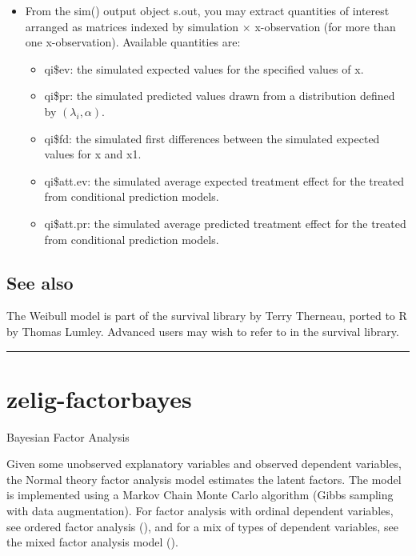 \documentclass[letterpaper,10pt,english]{sphinxmanual}
\begin{document}
\begin{itemize}
\begin{itemize}
\end{itemize}

\item {} 
From the sim() output object s.out, you may extract quantities of
interest arranged as matrices indexed by simulation \(\times\)
x-observation (for more than one x-observation). Available quantities
are:
\begin{itemize}
\item {} 
qi\$ev: the simulated expected values for the specified values of
x.

\item {} 
qi\$pr: the simulated predicted values drawn from a distribution
defined by \((\lambda_i, \alpha)\).

\item {} 
qi\$fd: the simulated first differences between the simulated
expected values for x and x1.

\item {} 
qi\$att.ev: the simulated average expected treatment effect for the
treated from conditional prediction models.

\item {} 
qi\$att.pr: the simulated average predicted treatment effect for
the treated from conditional prediction models.

\end{itemize}

\end{itemize}


\subsection{See also}
\label{vignette:id75}
The Weibull model is part of the survival library by Terry Therneau,
ported to R by Thomas Lumley. Advanced users may wish to refer to
 in the survival library.


\bigskip\hrule{}\bigskip



\section{zelig-factorbayes}
\label{vignette:zelig-factorbayes}\label{vignette:zfactorbayes}
Bayesian Factor Analysis

Given some unobserved explanatory variables and observed dependent
variables, the Normal theory factor analysis model estimates the latent
factors. The model is implemented using a Markov Chain Monte Carlo
algorithm (Gibbs sampling with data augmentation). For factor analysis
with ordinal dependent variables, see ordered factor analysis (), and
for a mix of types of dependent variables, see the mixed factor analysis
model ().
\end{document}
